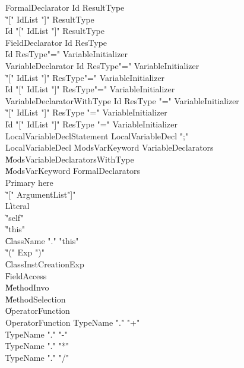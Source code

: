 {\begin{grammar}

 FormalDeclarator  \: Id ResultType\\
    \| \xcd"[" IdList \xcd"]" ResultType\\
    \| Id \xcd"[" IdList \xcd"]" ResultType\\
 FieldDeclarator  \: Id ResType\\
    \| Id ResType\opt \xcd"=" VariableInitializer\\
 VariableDeclarator  \: Id ResType\opt \xcd"=" VariableInitializer\\
    \| \xcd"[" IdList \xcd"]" ResType\opt \xcd"=" VariableInitializer\\
    \| Id \xcd"[" IdList \xcd"]" ResType\opt \xcd"=" VariableInitializer\\
 VariableDeclaratorWithType  \: Id ResType \xcd"=" VariableInitializer\\
    \| \xcd"[" IdList \xcd"]" ResType \xcd"=" VariableInitializer\\
    \| Id \xcd"[" IdList \xcd"]" ResType \xcd"=" VariableInitializer\\
 LocalVariableDeclStatement  \: LocalVariableDecl \xcd";"\\
 LocalVariableDecl  \: Mods\opt VarKeyword VariableDeclarators\\
    \| Mods\opt VariableDeclaratorsWithType\\
    \| Mods\opt VarKeyword FormalDeclarators\\
 Primary  \: here\\
    \| \xcd"[" ArgumentList\opt \xcd"]"\\
    \| Literal\\
    \| \xcd"self"\\
    \| \xcd"this"\\
    \| ClassName \xcd"." \xcd"this"\\
    \| \xcd"(" Exp \xcd")"\\
    \| ClassInstCreationExp\\
    \| FieldAccess\\
    \| MethodInvo\\
    \| MethodSelection\\
    \| OperatorFunction\\
 OperatorFunction  \: TypeName \xcd"." \xcd"+"\\
    \| TypeName \xcd"." \xcd"-"\\
    \| TypeName \xcd"." \xcd"*"\\
    \| TypeName \xcd"." \xcd"/"\\

\end{grammar}}
